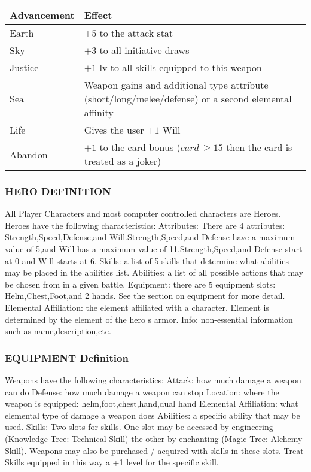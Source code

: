 \begin{center}
\begin{tabularx}{\textwidth}{X X}
\hline
Advancement & Effect\\
\hline
Earth & $+5$ to the attack stat\\
Sky & $+3$ to all initiative draws \\
Justice & $+1$ lv to all skills equipped to this weapon\\
Sea & Weapon gains and additional type attribute (short/long/melee/defense) or a second elemental affinity \\
Life & Gives the user $+1$ Will\\
Abandon & $+ 1$ to the card bonus ($card\,\geq15$ then the card is treated as a joker) \\
\hline
\end{tabularx}
\end{center}

\subsubsection{HERO DEFINITION}

All Player Characters and most computer controlled characters are Heroes.
Heroes have the following characteristics: Attributes: There are 4 attributes:
Strength,Speed,Defense,and Will.Strength,Speed,and Defense have a maximum value
of 5,and Will has a maximum value of 11.Strength,Speed,and Defense start at 0
and Will starts at 6.  Skills: a list of 5 skills that determine what abilities
may be placed in the abilities list.  Abilities: a list of all possible actions
that may be chosen from in a given battle.  Equipment: there are 5 equipment
slots: Helm,Chest,Foot,and 2 hands.  See the section on equipment for more
detail.  Elemental Affiliation: the element affiliated with a character.
Element is determined by the element of the hero s armor.  Info: non-essential
information such as name,description,etc.
\subsubsection{EQUIPMENT Definition}

Weapons have the following characteristics:
Attack: how much damage a weapon can do
Defense: how much damage a weapon can stop
Location: where the weapon is equipped: helm,foot,chest,hand,dual hand
Elemental Affiliation: what elemental type of damage a weapon does
Abilities: a specific ability that may be used.
Skills: Two slots for skills.  One slot may be accessed by engineering
(Knowledge Tree: Technical Skill) the other by enchanting (Magic Tree: Alchemy
Skill).  Weapons may also be purchased
/ acquired with skills in these slots.  Treat Skills equipped in this way a 
+1 level for the specific skill.
